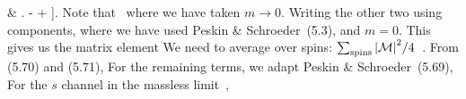 {{		&\hspace{1.5em} \left. \phantom{=\ } -  +  \right].
	}
	Note that~\cite[p.~132, 153]{Peskin}
	where we have taken $m \to 0$.  Writing the other two using components,
	where we have used Peskin \& Schroeder~(5.3),
	and $m = 0$.  This gives us the matrix element
	We need to average over spins: $\sum_\text{spins} \abs{\mathcal{M}}^2 / 4$~\cite[p.~132]{Peskin}.  From (5.70) and (5.71),
	For the remaining terms, we adapt Peskin \& Schroeder~(5.69),
	For the $s$ channel in the massless limit~\cite[p.~156]{Peskin},
	}
